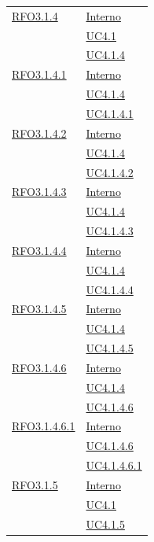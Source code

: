 \begin{itemize}
\begin{itemize}
\begin{itemize}
\begin{itemize}
\begin{longtable}{|>{\centering}m{5cm}|m{5cm}<{\centering}|}
\hyperlink{RFO3.1.4}{RFO3.1.4} & \hyperlink{Interno}{Interno}\\
& \hyperref[UC4.1]{UC4.1}\\
& \hyperref[UC4.1.4]{UC4.1.4}\\ \hline

\hyperlink{RFO3.1.4.1}{RFO3.1.4.1} & \hyperlink{Interno}{Interno}\\
& \hyperref[UC4.1.4]{UC4.1.4}\\
& \hyperref[UC4.1.4.1]{UC4.1.4.1}\\ \hline

\hyperlink{RFO3.1.4.2}{RFO3.1.4.2} & \hyperlink{Interno}{Interno}\\
& \hyperref[UC4.1.4]{UC4.1.4}\\
& \hyperref[UC4.1.4.2]{UC4.1.4.2}\\ \hline

\hyperlink{RFO3.1.4.3}{RFO3.1.4.3} & \hyperlink{Interno}{Interno}\\
& \hyperref[UC4.1.4]{UC4.1.4}\\
& \hyperref[UC4.1.4.3]{UC4.1.4.3}\\ \hline

\hyperlink{RFO3.1.4.4}{RFO3.1.4.4} & \hyperlink{Interno}{Interno}\\
& \hyperref[UC4.1.4]{UC4.1.4}\\
& \hyperref[UC4.1.4.4]{UC4.1.4.4}\\ \hline

\hyperlink{RFO3.1.4.5}{RFO3.1.4.5} & \hyperlink{Interno}{Interno}\\
& \hyperref[UC4.1.4]{UC4.1.4}\\
& \hyperref[UC4.1.4.5]{UC4.1.4.5}\\ \hline

\hyperlink{RFO3.1.4.6}{RFO3.1.4.6} & \hyperlink{Interno}{Interno}\\
& \hyperref[UC4.1.4]{UC4.1.4}\\
& \hyperref[UC4.1.4.6]{UC4.1.4.6}\\ \hline

\hyperlink{RFO3.1.4.6.1}{RFO3.1.4.6.1} & \hyperlink{Interno}{Interno}\\
& \hyperref[UC4.1.4.6]{UC4.1.4.6}\\
& \hyperref[UC4.1.4.6.1]{UC4.1.4.6.1}\\ \hline

\hyperlink{RFO3.1.5}{RFO3.1.5} & \hyperlink{Interno}{Interno}\\
& \hyperref[UC4.1]{UC4.1}\\
& \hyperref[UC4.1.5]{UC4.1.5}\\ \hline


\end{longtable}
\end{itemize}
\end{itemize}
\end{itemize}
\end{itemize}

